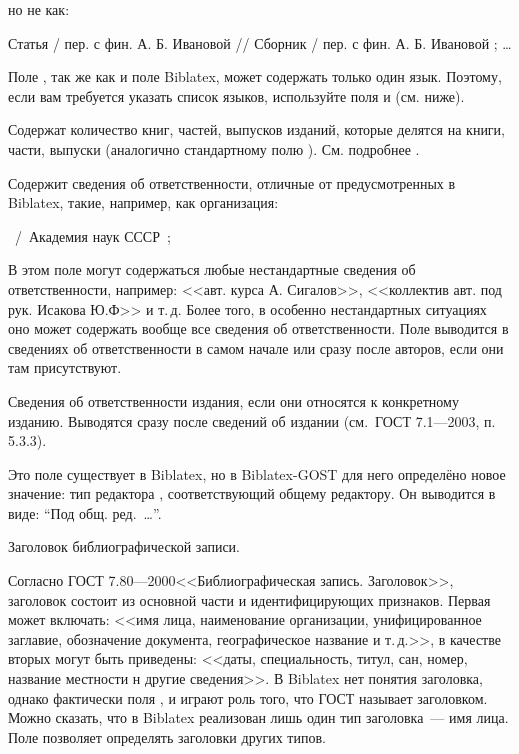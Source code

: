 \documentclass[10pt,a4paper,headings=small,numbers=enddot,english,russian]{ltxdockit}
\newcommand*{\biblatex}{Biblatex\xspace}
\newcommand*{\biblatexgost}{Biblatex-GOST\xspace}
\newcommand*{\gostbibname}[1][]{ГОСТ#1 7.1---2003\xspace}
\newcommand*{\gostheadname}[1][]{ГОСТ#1 7.80---2000\xspace}
\newcommand*{\gostbibref}[2][]{\gostbibname[#1], п.\,#2\xspace}
\newenvironment{bibexample}{\begin{list}
     {}
     {\setlength{\leftmargin}{\parindent}%
      \setlength{\itemindent}{-\leftmargin}%
      \setlength{\parsep}{0pt}}}
  {\end{list}}
\begin{document}
\begin{fieldlist}
но не как:

\begin{bibexample}
\item Статья / пер. с фин. А. Б. Ивановой // Сборник / пер. с фин. А. Б. Ивановой ; \ldots
\end{bibexample}

Поле , так же как и поле \biblatex {},
может содержать только один язык. Поэтому, если вам требуется указать список языков,
используйте поля  и  (см. ниже).


Содержат количество книг, частей, выпусков изданий,
которые делятся на книги, части, выпуски (аналогично стандартному полю ). См.
подробнее .


Содержит сведения об ответственности, отличные от предусмотренных в \biblatex,
такие, например, как организация:

\begin{bibexample}
\item \textellipsis\ \slash\ Академия наук СССР\ ;\ \textellipsis
\end{bibexample}

В этом поле могут содержаться любые нестандартные сведения об ответственности,
например: <<авт. курса А. Сигалов>>,
<<коллектив авт. под рук. Исакова Ю.Ф>> и т.\,д.
Более того, в особенно нестандартных ситуациях
оно может содержать вообще все сведения об ответственности.
Поле  выводится в сведениях об ответственности в самом начале или
сразу после авторов, если они там присутствуют.


Сведения об ответственности издания, если они относятся к конкретному изданию.
Выводятся сразу после сведений об издании (см.~\gostbibref{5.3.3}).


Это поле существует в \biblatex, но в \biblatexgost для него определёно новое значение:
тип редактора , соответствующий общему
редактору. Он выводится в виде: \enquote{Под общ. ред.~\ldots}.


Заголовок библиографической записи.

Согласно \gostheadname <<Библиографическая запись. Заголовок>>,
заголовок состоит из основной части и идентифицирующих признаков.
Первая может включать: <<имя лица, наименование организации, унифицированное
заглавие, обозначение документа, географическое название и т.\,д.>>,
в качестве вторых могут быть приведены: <<даты,
специальность, титул, сан, номер, название местности н другие сведения>>.
В \biblatex нет понятия заголовка, однако фактически поля ,  и
 играют роль того, что ГОСТ называет заголовком. Можно сказать,
что в \biblatex реализован лишь один тип заголовка~--- имя лица. Поле 
позволяет определять заголовки других типов.%


\end{fieldlist}
\end{document}
